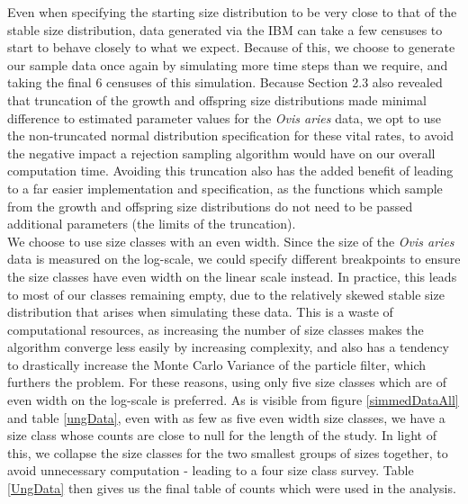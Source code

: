 \documentclass[a4paper,12pt]{article}
\begin{document}
Even when specifying the starting size distribution to be very close to that of the stable size distribution, data generated via the IBM can take a few censuses to start to behave closely to what we expect. Because of this, we choose to generate our sample data once again by simulating more time steps than we require, and taking the final 6 censuses of this simulation. Because Section 2.3 also revealed that truncation of the growth and offspring size distributions made minimal difference to estimated parameter values for the \textit{Ovis aries} data, we opt to use the non-truncated normal distribution specification for these vital rates, to avoid the negative impact a rejection sampling algorithm would have on our overall computation time. Avoiding this truncation also has the added benefit of leading to a far easier implementation and specification, as the functions which sample from the growth and offspring size distributions do not need to be passed additional parameters (the limits of the truncation). \\

We choose to use size classes with an even width. Since the size of the \textit{Ovis aries} data is measured on the log-scale, we could specify different breakpoints to ensure the size classes have even width on the linear scale instead. In practice, this leads to most of our classes remaining empty, due to the relatively skewed stable size distribution that arises when simulating these data. This is a waste of computational resources, as increasing the number of size classes makes the algorithm converge less easily by increasing complexity, and also has a tendency to drastically increase the Monte Carlo Variance of the particle filter, which furthers the problem. For these reasons, using only five size classes which are of even width on the log-scale is preferred. As is visible from figure \ref{simmedDataAll} and table \ref{ungData}, even with as few as five even width size classes, we have a size class whose counts are close to null for the length of the study. In light of this, we collapse the size classes for the two smallest groups of sizes together, to avoid unnecessary computation - leading to a four size class survey. Table \ref{UngData} then gives us the final table of counts which were used in the analysis. \\
\end{document}
